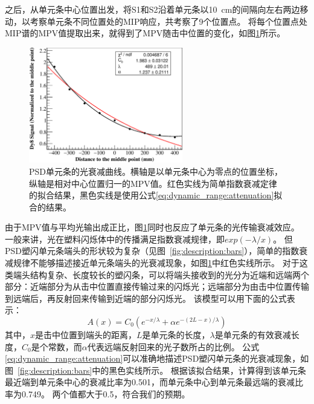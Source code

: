 之后，从单元条中心位置出发，将S1和S2沿着单元条以\SI{10}{cm}的间隔向左右两边移动，以考察单元条不同位置处的MIP响应，共考察了9个位置点。
将每个位置点处MIP谱的MPV值提取出来，就得到了MPV随击中位置的变化，如图\ref{fig:dynamic_range:attenuation}所示。
\begin{figure}[htbp]
	\centering
	\includegraphics[width=0.6\textwidth]{chap/dynamic_range/fig/atten_right.eps}
	\caption{PSD单元条的光衰减曲线。横轴是以单元条中心为零点的位置坐标，纵轴是相对中心位置归一的MPV值。红色实线为简单指数衰减定律的拟合结果，黑色实线是使用公式\ref{eq:dynamic_range:attenuation}拟合的结果。}
	\label{fig:dynamic_range:attenuation}
\end{figure}
由于MPV值与平均光输出成正比，图\ref{fig:dynamic_range:attenuation}同时也反应了单元条的光传输衰减效应。
一般来讲，光在塑料闪烁体中的传播满足指数衰减规律，即$exp(-\lambda/x)$。
但PSD塑闪单元条端头的形状较为复杂（见图~\ref{fig:description:bars}），简单的指数衰减规律不能够描述接近单元条端头的光衰减现象，如图\ref{fig:dynamic_range:attenuation}中红色实线所示。
对于这类端头结构复杂、长度较长的塑闪条，可以将端头接收到的光分为近端和远端两个部分\cite{atten_taiuti_measurement_1996,atten_karsch_design_2001}：近端部分为从击中位置直接传输过来的闪烁光；远端部分为由击中位置传输到远端后，再反射回来传输到近端的部分闪烁光。
该模型可以用下面的公式表示：
\begin{equation}
A(x)=C_0(e^{-x/\lambda} + \alpha e^{-(2L-x)/\lambda})
\label{eq:dynamic_range:attenuation}
\end{equation}
其中，$x$是击中位置到端头的距离，$L$是单元条的长度，$\lambda$是单元条的有效衰减长度，$C_0$是个常数，而$\alpha$代表远端反射回来的光子数所占的比例。
公式\ref{eq:dynamic_range:attenuation}可以准确地描述PSD塑闪单元条的光衰减现象，如图~\ref{fig:description:bars}中的黑色实线所示。
根据该拟合结果，计算得到该单元条最近端到单元条中心的衰减比率为0.501，而单元条中心到单元条最远端的衰减比率为0.749。
两个值都大于0.5，符合我们的预期。


